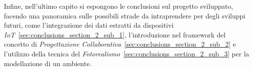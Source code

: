 Infine, nell'ultimo capito si espongono le conclusioni sul progetto sviluppato, facendo una panoramica sulle possibili strade
da intraprendere per degli sviluppi futuri, come l'integrazione dei dati estratti da dispositivi
\emph{IoT}~\ref{sec:conclusions_section_2_sub_1},
l'introduzione nel framework del concetto di \emph{Progettazione Collaborativa}~\ref{sec:conclusions_section_2_sub_2}
e l'utilizzo della tecnica del \emph{Fotorealismo}~\ref{sec:conclusions_section_2_sub_3} per la modellazione di un ambiente.
